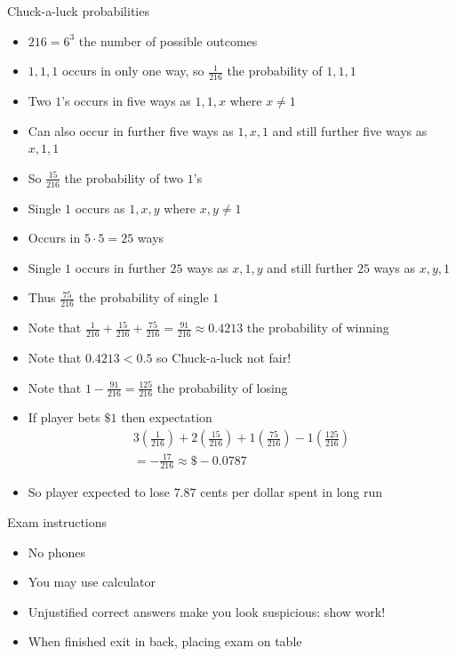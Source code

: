 \documentclass[handout]{beamer}
\theoremstyle{definition}
\begin{document}
\begin{frame}{Chuck-a-luck probabilities}
\begin{itemize}
\item $216=6^3$ the number of possible outcomes
\item $1,1,1$ occurs in only one way, so $\frac{1}{216}$
the probability of $1,1,1$
\item Two $1$'s occurs in five ways as $1,1,x$
where $x\ne 1$
\item Can also occur in further five ways as $1,x,1$
and still further five ways as $x,1,1$
\item So $\frac{15}{216}$ the probability of two $1$'s
\item Single $1$ occurs as $1,x,y$ where $x,y\ne 1$
\item Occurs in $5\cdot 5=25$ ways
\item Single $1$ occurs in further $25$ ways as $x,1,y$
and still further $25$ ways as $x,y,1$
\item Thus $\frac{75}{216}$ the probability of single $1$
\end{itemize}
\end{frame}

\begin{frame}
\begin{itemize}
\item Note that $\frac{1}{216}+\frac{15}{216}+\frac{75}{216}
=\frac{91}{216}\approx 0.4213$ the probability of winning
\item Note that $0.4213<0.5$ so Chuck-a-luck \alert{not} fair!
\item Note that $1-\frac{91}{216}=\frac{125}{216}$
the probability of losing
\item If player bets $\$1$ then expectation
\begin{multline*}
3\left(\frac{1}{216}\right)
+2\left(\frac{15}{216}\right)+1\left(\frac{75}{216}\right)
-1\left(\frac{125}{216}\right)\\
=-\frac{17}{216}\approx \$-0.0787
\end{multline*}
\item So player expected to lose $7.87$ cents per dollar spent
in long run
\end{itemize}
\end{frame}

\begin{frame}{Exam instructions}
\begin{itemize}
\item No phones
\item You \alert{may} use calculator
\item Unjustified correct answers make you look suspicious:
\alert{show work}!
\item When finished exit in back, placing exam on table
\end{itemize}
\end{frame}
\end{document}
